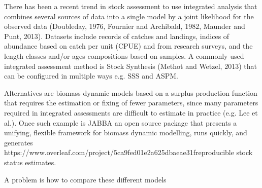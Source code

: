 
There has been a recent trend in stock assessment to use integrated analysis that combines several sources of data into a single model by a joint likelihood for the observed data (Doubleday, 1976, Fournier and Archibald, 1982, Maunder and Punt, 2013).  Datasets include records of catches and landings, indices of abundance based on catch per unit (CPUE) and from research surveys, and the length classes and/or ages compositions based on samples. A commonly used integrated assessment method is Stock Synthesis (Methot and Wetzel, 2013) that can be configured in multiple ways e.g. SSS and ASPM.

Alternatives are biomass dynamic models based on a surplus production function that requires the estimation or fixing of fewer parameters, since many parameters required in integrated assessments are difficult to estimate in practice (e.g. Lee et al.). Once such example is JABBA an open source package that presents a unifying, flexible framework for biomass dynamic modelling, runs quickly, and generates https://www.overleaf.com/project/5ca9fed01e2a625dbaeae31freproducible stock status estimates.

A problem is how to compare these different models


